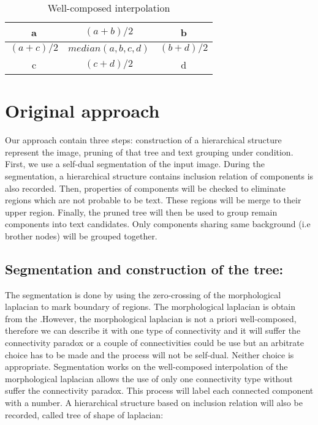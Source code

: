 \documentclass[12pt,a4paper,draft]{article}
\begin{document}
\begin{table}
	\caption{Well-composed interpolation} \label{WllCmpInterpolation}
	\centering
	\begin{tabular}{|c|c|c|}
	\hline 
	a & ${(a+b)}/{2}$ & b \\ 
	\hline 
	${(a+c)}/{2}$ & $median(a,b,c,d)$ & ${(b+d)}/{2}$ \\ 
	\hline 
	c & ${(c+d)}/{2}$ & d \\ 
	\hline 

	\end{tabular}
	
\end{table}

\section{Original approach}


Our approach contain three steps: construction of a hierarchical structure represent the image, pruning of that tree and text grouping under condition. First, we use a self-dual segmentation of the input image. During the segmentation, a hierarchical structure contains inclusion relation of components is also recorded. Then, properties of components will be checked to eliminate regions which are not probable to be text. These regions will be merge to their upper region. Finally, the pruned tree will then be used to group remain components into text candidates. Only components sharing same background (i.e brother nodes) will be grouped together. 


\subsection{Segmentation and construction of the tree:}

The segmentation is done by using the zero-crossing of the morphological laplacian to mark boundary of regions. The morphological laplacian is obtain from the .However, the morphological laplacian is not a priori well-composed, therefore we can describe it with one type of connectivity and it will suffer the connectivity paradox or a couple of connectivities could be use but an arbitrate choice has to be made and the process will not be self-dual. Neither choice is appropriate. Segmentation works on the well-composed interpolation of the morphological laplacian allows the use of only one connectivity type without suffer the connectivity paradox. This process will label each connected component with a number. A hierarchical structure based on inclusion relation will also be recorded, called tree of shape of laplacian: 
\end{document}
